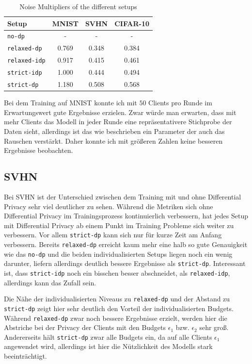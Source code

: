 \begin{table}
	\centering
	\begin{tabular}{|l|c|c|c|}
		\hline
		Setup & MNIST & SVHN & CIFAR-10 \\
		\hline
		\texttt{no-dp} & - & - & - \\
		\texttt{relaxed-dp} & 0.769 & 0.348 & 0.384 \\
		\texttt{relaxed-idp} & 0.917 & 0.415 & 0.461 \\
		\texttt{strict-idp} & 1.000 & 0.444 & 0.494 \\
		\texttt{strict-dp} & 1.180 & 0.508 & 0.568 \\
		\hline
	\end{tabular}
	\caption{Noise Multipliers of the different setups}
	\label{tab:noise-multipliers}
\end{table}

Bei dem Training auf MNIST konnte ich mit $50$ Clients pro Runde im Erwartungswert gute Ergebnisse erzielen. Zwar würde man erwarten, dass mit mehr Clients das Modell in jeder Runde eine repräsentativere Stichprobe der Daten sieht, allerdings ist das wie beschrieben ein Parameter der auch das Rauschen verstärkt. Daher konnte ich mit größeren Zahlen keine besseren Ergebnisse beobachten.

\subsection{SVHN}

Bei SVHN ist der Unterschied zwischen dem Training mit und ohne Differential Privacy sehr viel deutlicher zu sehen. Während die Metriken sich ohne Differential Privacy im Trainingsprozess kontinuierlich verbessern, hat jedes Setup mit Differential Privacy ab einem Punkt im Training Probleme sich weiter zu verbessern. Vor allem \texttt{strict-dp} kann sich nur für kurze Zeit am Anfang verbessern. Bereits \texttt{relaxed-dp} erreicht kaum mehr eine halb so gute Genauigkeit wie das \texttt{no-dp} und die beiden individualisierten Setups liegen noch ein wenig darunter, liefern allerdings deutlich bessere Ergebnisse als \texttt{strict-dp}. Interessant ist, dass \texttt{strict-idp} noch ein bisschen besser abschneidet, als \texttt{relaxed-idp}, allerdings kann das Zufall sein.

Die Nähe der individualisierten Niveaus zu \texttt{relaxed-dp} und der Abstand zu \texttt{strict-dp} zeigt hier sehr deutlich den Vorteil der individualisierten Budgets. Während \texttt{relaxed-dp} zwar noch bessere Ergebnisse erzielt, werden hier die Abstriche bei der Privacy der Clients mit den Budgets $\epsilon_1$ bzw. $\epsilon_2$ sehr groß. Andererseits hält \texttt{strict-dp} zwar alle Budgets ein, da auf alle Clients $\epsilon_1$ angewendet wird, allerdings ist hier die Nützlichkeit des Modells stark beeinträchtigt.

